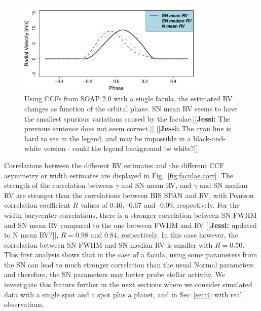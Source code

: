 \documentclass{aa}
\newcommand{\jessi}[1]{{\color{Purple}[[\textbf{Jessi: }#1]]}}
\begin{document}
\begin{figure}[htbp]
\begin{center}
\includegraphics[width=3.6in]{RV_comparison_FACULAE.pdf} 
\caption{Using CCFs from SOAP 2.0 with a single facula, the estimated RV changes as function of the orbital phase. SN mean RV seems to have the smallest spurious variations caused by the faculae.\jessi{The previous sentence does not seem correct.}  \jessi{The cyan line is hard to see in the legend, and may be impossible in a black-and-white version - could the legend background be white?}
}
    \label{fig:faculae}
\end{center}
\end{figure}

Correlations between the different RV estimates and the different CCF asymmetry or width estimates are displayed in Fig.~\ref{fig:faculae.corr}. The strength of the correlation between $\gamma$ and SN mean RV, and $\gamma$ and SN median RV are stronger than the correlations between BIS SPAN and RV, with Pearson correlation coefficient $R$ values of 0.46, -0.67 and -0.09, respectively. For the width barycenter correlations, there is a stronger correlation between SN FWHM and SN mean RV compared to the one between FWHM and RV \jessi{updated to N mean RV?}, $R=0.98$ and 0.84, respectively. In this case however, the correlation between SN FWHM and SN median RV is smaller with $R=0.50$. This first analysis shows that in the case of a facula, using some parameters from the SN can lead to much stronger correlation than the usual Normal parameters and therefore, the SN parameters may better probe stellar activity. We investigate this feature further in the next sections where we consider simulated data with a single spot and a spot plus a planet, and in Sec~\ref{sec:4} with real observations.
\end{document}
